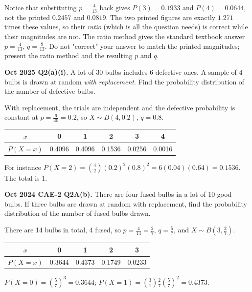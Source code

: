 \documentclass[11pt,a4paper]{article}
\begin{document}
\begin{dangerbox}
Notice that substituting $p=\frac4{13}$ back gives $P(3)=0.1933$ and $P(4)=0.0644$, not the printed $0.2457$ and $0.0819$. The two printed figures are exactly $1.271$ times these values, so their \emph{ratio} (which is all the question needs) is correct while their magnitudes are not. The ratio method gives the standard textbook answer $p=\frac4{13}$, $q=\frac9{13}$. Do not "correct" your answer to match the printed magnitudes; present the ratio method and the resulting $p$ and $q$.
\end{dangerbox}

\begin{pyqbox}
\textbf{Oct 2025 Q2(a)(i).} A lot of 30 bulbs includes 6 defective ones. A sample of 4 bulbs is drawn at random \emph{with replacement}. Find the probability distribution of the number of defective bulbs.
\end{pyqbox}

\begin{solbox}
With replacement, the trials are independent and the defective probability is constant at $p=\frac6{30}=0.2$, so $X\sim B(4,0.2)$, $q=0.8$.

\begin{center}\small
\begin{tabular}{c|ccccc}
\toprule $x$ & 0 & 1 & 2 & 3 & 4\\\midrule
$P(X=x)$ & 0.4096 & 0.4096 & 0.1536 & 0.0256 & 0.0016\\\bottomrule
\end{tabular}
\end{center}

For instance $P(X=2)=\binom42(0.2)^2(0.8)^2=6(0.04)(0.64)=0.1536$. The total is 1.
\end{solbox}

\begin{pyqbox}
\textbf{Oct 2024 CAE-2 Q2A(b).} There are four fused bulbs in a lot of 10 good bulbs. If three bulbs are drawn at random with replacement, find the probability distribution of the number of fused bulbs drawn.
\end{pyqbox}

\begin{solbox}
There are 14 bulbs in total, 4 fused, so $p=\frac4{14}=\frac27$, $q=\frac57$, and $X\sim B(3,\frac27)$.

\begin{center}\small
\begin{tabular}{c|cccc}
\toprule $x$ & 0 & 1 & 2 & 3\\\midrule
$P(X=x)$ & 0.3644 & 0.4373 & 0.1749 & 0.0233\\\bottomrule
\end{tabular}
\end{center}

$P(X=0)=\left(\frac57\right)^3=0.3644$; $P(X=1)=\binom31\frac27\left(\frac57\right)^2=0.4373$.
\end{solbox}
\end{document}

